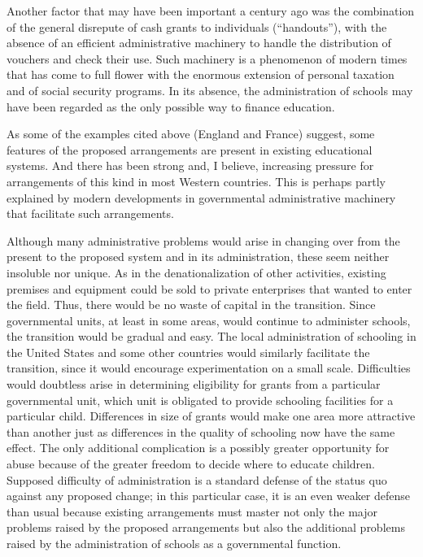 \documentclass[11pt,openany]{book}
\begin{document}
Another factor that may have been important a century ago was the combination of the general disrepute of cash grants to individuals (``handouts''), with the absence of an efficient administrative machinery to handle the distribution of vouchers and check their use. Such machinery is a phenomenon of modern times that has come to full flower with the enormous extension of personal taxation and of social security programs. In its absence, the administration of schools may have been regarded as the only possible way to finance education.

As some of the examples cited above (England and France) suggest, some features of the proposed arrangements are present in existing educational systems. And there has been strong and, I believe, increasing pressure for arrangements of this kind in most Western countries. This is perhaps partly explained by modern developments in governmental administrative machinery that facilitate such arrangements.

Although many administrative problems would arise in changing over from the present to the proposed system and in its administration, these seem neither insoluble nor unique. As in the denationalization of other activities, existing premises and equipment could be sold to private enterprises that wanted to enter the field. Thus, there would be no waste of capital in the transition. Since governmental units, at least in some areas, would continue to administer schools, the transition would be gradual and easy. The local administration of schooling in the United States and some other countries would similarly facilitate the transition, since it would encourage experimentation on a small scale. Difficulties would doubtless arise in determining eligibility for grants from a particular governmental unit, which unit is obligated to provide schooling facilities for a particular child. Differences in size of grants would make one area more attractive than another just as differences in the quality of schooling now have the same effect. The only additional complication is a possibly greater opportunity for abuse because of the greater freedom to decide where to educate children. Supposed difficulty of administration is a standard defense of the status quo against any proposed change; in this particular case, it is an even weaker defense than usual because existing arrangements must master not only the major problems raised by the proposed arrangements but also the additional problems raised by the administration of schools as a governmental function.
\end{document}
